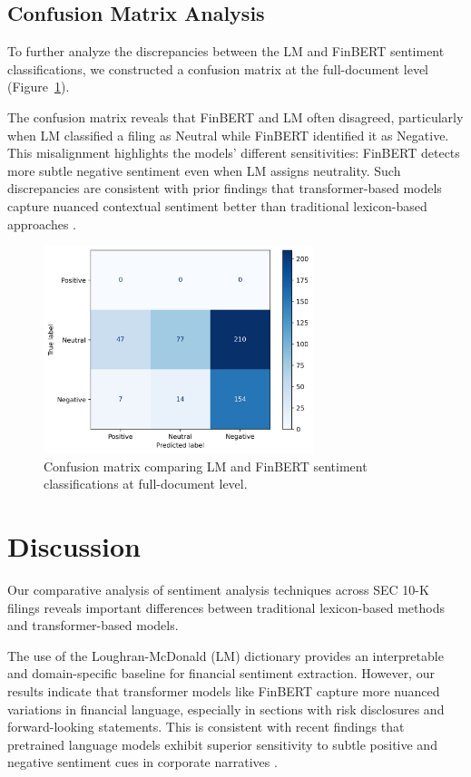 \documentclass[12pt]{article}
\begin{document}
\subsection{Confusion Matrix Analysis}

To further analyze the discrepancies between the LM and FinBERT sentiment classifications, we constructed a confusion matrix at the full-document level (Figure~\ref{fig:confusion_matrix}). 

The confusion matrix reveals that FinBERT and LM often disagreed, particularly when LM classified a filing as Neutral while FinBERT identified it as Negative. This misalignment highlights the models’ different sensitivities: FinBERT detects more subtle negative sentiment even when LM assigns neutrality. Such discrepancies are consistent with prior findings that transformer-based models capture nuanced contextual sentiment better than traditional lexicon-based approaches \citep{Huang2020}.

\begin{figure}[H]
\centering
\includegraphics[width=0.7\textwidth]{figures/confusion_matrix_full_doc.png}
\caption{Confusion matrix comparing LM and FinBERT sentiment classifications at full-document level.}
\label{fig:confusion_matrix}
\end{figure}

\section{Discussion}

Our comparative analysis of sentiment analysis techniques across SEC 10-K filings reveals important differences between traditional lexicon-based methods and transformer-based models.

The use of the Loughran-McDonald (LM) dictionary \citep{Loughran2011} provides an interpretable and domain-specific baseline for financial sentiment extraction. However, our results indicate that transformer models like FinBERT \citep{Araci2019} capture more nuanced variations in financial language, especially in sections with risk disclosures and forward-looking statements. This is consistent with recent findings that pretrained language models exhibit superior sensitivity to subtle positive and negative sentiment cues in corporate narratives \citep{Huang2020}.
\end{document}

